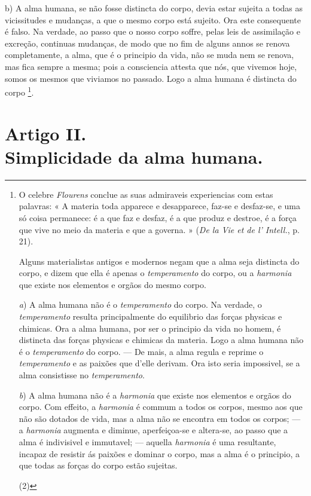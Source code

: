 b) A alma humana, se não fosse distincta do corpo, devia estar sujeita a todas as vicissitudes e mudanças, a que o mesmo corpo está sujeito. Ora este consequente é falso. Na verdade, ao passo que o nosso corpo soffre, pelas leis de assimilação e excreção, continuas mudanças, de modo que no fim de alguns annos se renova completamente, a alma, que é o principio da vida, não se muda nem se renova, mas fica sempre a mesma; pois a consciencia attesta que nós, que   vivemos hoje, somos os mesmos que viviamos no passado. Logo a alma humana é distincta do corpo \footnote{O celebre \emph{Flourens} conclue as suas admiraveis experiencias com estas palavras: « A materia toda apparece e desapparece, faz-se e desfaz-se, e uma só coisa permanece: é a que faz e desfaz, é a que produz e destroe, é a força que vive no meio da materia e que a governa. » (\emph{De la Vie et de l' Intell.}, p. 21).\par Alguns materialistas antigos e modernos negam que a alma seja distincta do corpo, e dizem que ella é apenas o \emph{temperamento} do corpo, ou a \emph{harmonia} que existe nos elementos e orgãos do mesmo corpo.\par \emph{a}) A alma humana não é o \emph{temperamento} do corpo. Na verdade, o \emph{temperamento} resulta principalmente do equilibrio das forças physicas e chimicas. Ora a alma humana, por ser o principio da vida no homem, é distincta das forças physicas e chimicas da materia. Logo a alma humana não é o \emph{temperamento} do corpo. --- De mais, a alma regula e reprime o \emph{temperamento} e as paixões que d'elle derivam. Ora isto seria impossivel, se a alma consistisse no \emph{temperamento}.\par \emph{b}) A alma humana não é a \emph{harmonia} que existe nos elementos e orgãos do corpo. Com effeito, a \emph{harmonia} é commum a todos os corpos, mesmo aos que não são dotados de vida, mas a alma não se encontra em todos os corpos; --- a \emph{harmonia} augmenta e diminue, aperfeiçoa-se e altera-se, ao passo que a alma é indivisivel e immutavel; --- aquella \emph{harmonia} é uma resultante, incapaz de resistir ás paixões e dominar o corpo, mas a alma é o principio, a que todas as forças do corpo estão sujeitas.\par (2)}.


\section*{Artigo II.\\ Simplicidade da alma humana.}

